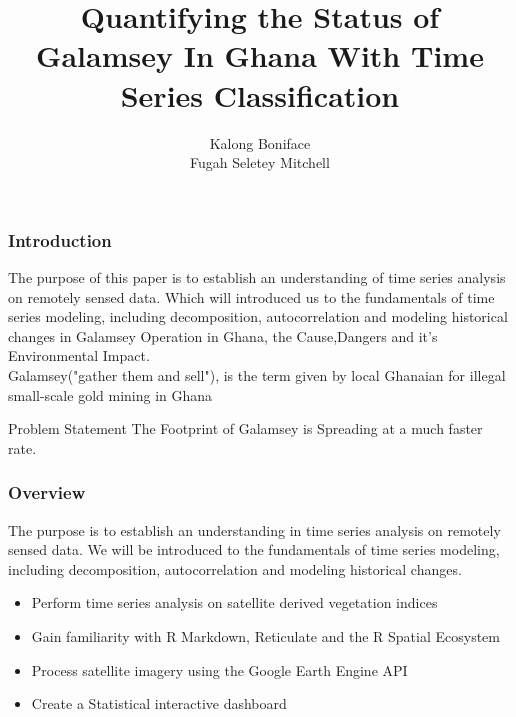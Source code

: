 \documentclass[11pt]{beamer}
\begin{document}
	\title{Quantifying the Status of Galamsey In Ghana With Time Series Classification}
	\author{Kalong Boniface\\ Fugah Seletey Mitchell}
	\begin{frame}[plain]
		\maketitle
	\end{frame}
	
	\begin{frame}
		\frametitle{Introduction}
	The purpose of this paper is to establish an understanding of time series analysis on remotely sensed data. Which will introduced us to the fundamentals of time series modeling, including decomposition, autocorrelation and modeling historical changes in Galamsey Operation in Ghana, the Cause,Dangers and it's Environmental Impact.\\
Galamsey("gather them and sell")\parencite{OwusuNimo2018}, is the term given by local Ghanaian for illegal small-scale gold mining in Ghana\parencite{DavidYawDanquah2019}
	\end{frame}
    \begin{frame}
    	\begin{block}{Problem Statement}
             	The Footprint of Galamsey is Spreading at a much faster rate.
    	\end{block}
    \end{frame}
    \begin{frame}
    	\frametitle{Overview}
    	
    The purpose  is to establish an understanding in time series analysis on remotely sensed data. We will be introduced to the fundamentals of time series modeling, including decomposition, autocorrelation and modeling historical changes.\\
         \begin{itemize}
		\item  Perform time series analysis on satellite derived vegetation indices\\
		\item  Gain familiarity with R Markdown, Reticulate and the R Spatial Ecosystem\\
		\item  Process satellite imagery using the Google Earth Engine API\\
		\item  Create a Statistical  interactive dashboard\
         \end{itemize}
    \end{frame}
\end{document}
